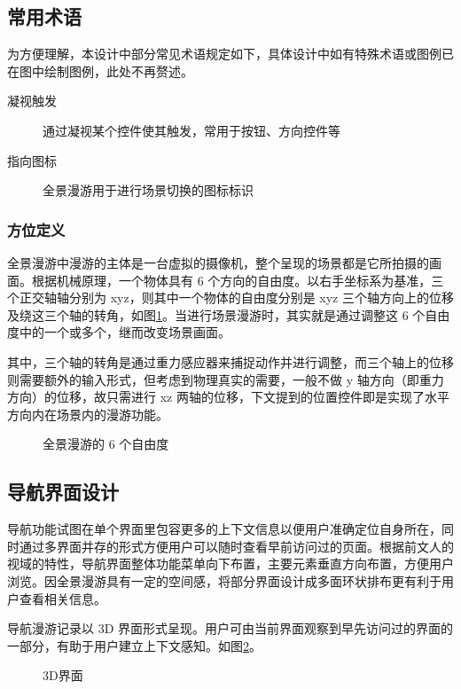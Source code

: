 \subsection{常用术语}
为方便理解，本设计中部分常见术语规定如下，具体设计中如有特殊术语或图例已在图中绘制图例，此处不再赘述。

\begin{description}
  \item [凝视触发] 通过凝视某个控件使其触发，常用于按钮、方向控件等
  \item [指向图标] 全景漫游用于进行场景切换的图标标识
\end{description}

\subsubsection{方位定义}
全景漫游中漫游的主体是一台虚拟的摄像机，整个呈现的场景都是它所拍摄的画面。根据机械原理，一个物体具有 6 个方向的自由度。以右手坐标系为基准，三个正交轴轴分别为 xyz，则其中一个物体的自由度分别是 xyz 三个轴方向上的位移及绕这三个轴的转角，如图\ref{fig:d-13}。当进行场景漫游时，其实就是通过调整这 6 个自由度中的一个或多个，继而改变场景画面。

其中，三个轴的转角是通过重力感应器来捕捉动作并进行调整，而三个轴上的位移则需要额外的输入形式，但考虑到物理真实的需要，一般不做 y 轴方向（即重力方向）的位移，故只需进行 xz 两轴的位移，下文提到的位置控件即是实现了水平方向内在场景内的漫游功能。

\begin{figure}[htp]
\centering
{}
\caption{全景漫游的 6 个自由度}
\label{fig:d-13}
\end{figure}

\subsection{导航界面设计}
导航功能试图在单个界面里包容更多的上下文信息以便用户准确定位自身所在，同时通过多界面并存的形式方便用户可以随时查看早前访问过的页面。根据前文人的视域的特性，导航界面整体功能菜单向下布置，主要元素垂直方向布置，方便用户浏览。因全景漫游具有一定的空间感，将部分界面设计成多面环状排布更有利于用户查看相关信息。

导航漫游记录以 3D 界面形式呈现。用户可由当前界面观察到早先访问过的界面的一部分，有助于用户建立上下文感知。如图\ref{fig:d-03}。

\begin{figure}[htp]
\centering
{}
\caption{3D界面}
\label{fig:d-03}
\end{figure}

